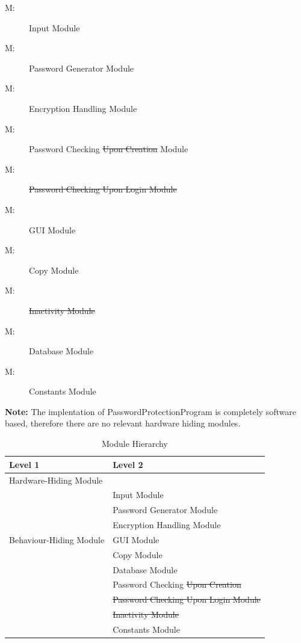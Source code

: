 \documentclass[12pt, titlepage]{article}
\newcounter{mnum}
\newcommand{\mthemnum}{M\themnum}
\begin{document}
\begin{description}
  \item [ \mthemnum \label{mIn}:] Input Module
  \item [ \mthemnum \label{mPG}:] Password Generator Module
  \item [ \mthemnum \label{mEH}:] Encryption Handling Module
  \item [ \mthemnum \label{mPCUC}:] Password Checking \sout{Upon Creation} Module
  \item [ \mthemnum \label{mPCUL}:] \sout{Password Checking Upon Login Module}
  \item [ \mthemnum \label{mGUI}:] GUI Module
  \item [ \mthemnum \label{mCop}:] Copy Module
  \item [ \mthemnum \label{mInac}:] \sout{Inactivity Module}
  \item [ \mthemnum \label{mDB}:] Database Module
  \item [ \mthemnum \label{mCons}:] Constants Module

\end{description}

\textbf{Note:} The implentation of PasswordProtectionProgram is completely software based, therefore there are no relevant hardware hiding modules.

\begin{table}[h!]
\centering
\begin{tabular}{p{} p{}}
\toprule
\textbf{Level 1} & \textbf{Level 2}\\
\midrule

{Hardware-Hiding Module} & ~ \\
\midrule

\multirow{7}{0.3\textwidth}{Behaviour-Hiding Module} 
& Input Module\\
& Password Generator Module\\
& Encryption Handling Module\\
& GUI Module\\
& Copy Module\\
& Database Module\\ 
\midrule

\multirow{3}{0.3\textwidth}{Software Decision Module} 
& Password Checking \sout{Upon Creation}\\
& \sout{Password Checking Upon Login Module}\\
& \sout{Inactivity Module}\\
& Constants Module\\
\bottomrule

\end{tabular}
\caption{Module Hierarchy}
\label{TblMH}
\end{table}
\end{document}
